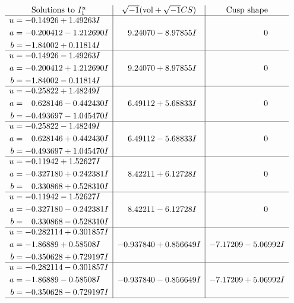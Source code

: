 \documentclass[1p]{elsarticle_modified}
\theoremstyle{definition}
\newcommand{\I}{\sqrt{-1}}
\begin{document}
$$\begin{array}{c|c|c}
\text{Solutions to }I^u_{1}& \I (\text{vol} + \sqrt{-1}CS) & \text{Cusp shape}\\
 \hline 
\begin{aligned}
u &= -0.14926 + 1.49263 I \\
a &= -0.200412 - 1.212690 I \\
b &= -1.84002 + 0.11814 I\end{aligned}
 & \phantom{-}9.24070 - 8.97855 I & \phantom{-0.000000 } 0 \\ \hline\begin{aligned}
u &= -0.14926 - 1.49263 I \\
a &= -0.200412 + 1.212690 I \\
b &= -1.84002 - 0.11814 I\end{aligned}
 & \phantom{-}9.24070 + 8.97855 I & \phantom{-0.000000 } 0 \\ \hline\begin{aligned}
u &= -0.25822 + 1.48249 I \\
a &= \phantom{-}0.628146 - 0.442430 I \\
b &= -0.493697 - 1.045470 I\end{aligned}
 & \phantom{-}6.49112 + 5.68833 I & \phantom{-0.000000 } 0 \\ \hline\begin{aligned}
u &= -0.25822 - 1.48249 I \\
a &= \phantom{-}0.628146 + 0.442430 I \\
b &= -0.493697 + 1.045470 I\end{aligned}
 & \phantom{-}6.49112 - 5.68833 I & \phantom{-0.000000 } 0 \\ \hline\begin{aligned}
u &= -0.11942 + 1.52627 I \\
a &= -0.327180 + 0.242381 I \\
b &= \phantom{-}0.330868 + 0.528310 I\end{aligned}
 & \phantom{-}8.42211 + 6.12728 I & \phantom{-0.000000 } 0 \\ \hline\begin{aligned}
u &= -0.11942 - 1.52627 I \\
a &= -0.327180 - 0.242381 I \\
b &= \phantom{-}0.330868 - 0.528310 I\end{aligned}
 & \phantom{-}8.42211 - 6.12728 I & \phantom{-0.000000 } 0 \\ \hline\begin{aligned}
u &= -0.282114 + 0.301857 I \\
a &= -1.86889 + 0.58508 I \\
b &= -0.350628 + 0.729197 I\end{aligned}
 & -0.937840 + 0.856649 I & -7.17209 - 5.06992 I \\ \hline\begin{aligned}
u &= -0.282114 - 0.301857 I \\
a &= -1.86889 - 0.58508 I \\
b &= -0.350628 - 0.729197 I\end{aligned}
 & -0.937840 - 0.856649 I & -7.17209 + 5.06992 I\\
 \hline 
 \end{array}$$\newpage\newpage\renewcommand{\arraystretch}{1}
\end{document}
